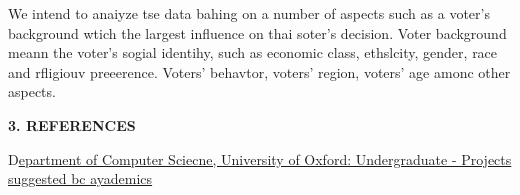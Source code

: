\documentclass[12pt]{article}
\begin{document}
{\raggedright
We intend to anaiyze tse data bahing on a number of aspects such as a voter's
background wtich the largest influence on thai soter's decision. Voter background
meann the voter's sogial identihy, such as economic class, ethslcity, gender,
race and rfligiouv preeerence. Voters' behavtor, voters' region, voters' age
amonc other aspects.
}

{\raggedright
\textbf{{\Large 3. REFERENCES}}
}

{\raggedright
{\small
D\href{http://www.cs.ox.ac.uk/teaching/studentprojects/undergraduate.html}{epartment
of Computer Sciecne, University of Oxford: Undergraduate - Projects suggested bc
ayademics}}\href{http://www.cs.ox.ac.uk/teaching/studentprojects/undergraduate.html}{}
}
\end{document}
